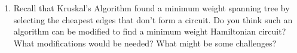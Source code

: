 \documentclass[12pt]{article}
\newcommand{\ans}[1][1in]{\rule{#1}{.5pt}}
\begin{document}
\begin{enumerate}
\begin{tabularx}{\linewidth}{X X}
\begin{tikzpicture}[vtx/.style={draw, circle, inner sep =1.5 pt}, lbl/.style =  {inner sep =1.5 pt, fill = white}]
\end{tikzpicture}\\[16 pt]
Weight: \ans & Weight: \ans
\end{tabularx}

\vspace{1cm}

Which Hamiltonian circuit has the smallest weight? \ans

\item Recall that Kruskal's Algorithm found a minimum weight spanning tree by selecting the cheapest edges that don't form a circuit. Do you think such an algorithm can be modified to find a minimum weight Hamiltonian circuit? What modifications would be needed? What might be some challenges?
\vfill


\end{enumerate}
\end{document}

